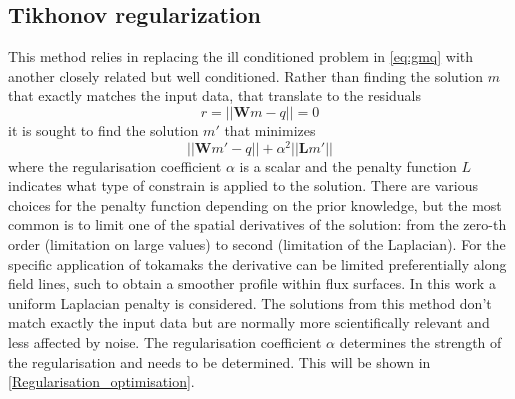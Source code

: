\subsection{Tikhonov regularization}
This method relies in replacing the ill conditioned problem in \autoref{eq:gmq} with another closely related but well conditioned. Rather than finding the solution $m$ that exactly matches the input data, that translate to the residuals
\begin{equation}
r = ||\bm{W}m-q|| = 0
\label{eq:tikhonov1}
\end{equation}
it is sought to find the solution $m'$ that minimizes
\begin{equation}
||\bm{W}m'-q|| + \alpha^2 ||\bm{L}m'||
\label{eq:tikhonov2}
\end{equation}
where the regularisation coefficient $\alpha$ is a scalar and the penalty function $L$ indicates what type of constrain is applied to the solution. There are various choices for the penalty function depending on the prior knowledge, but the most common is to limit one of the spatial derivatives of the solution: from the zero-th order (limitation on large values) to second (limitation of the Laplacian). For the specific application of tokamaks the derivative can be limited preferentially along field lines, such to obtain a smoother profile within flux surfaces.\cite{Schou2015} In this work a uniform Laplacian penalty is considered. The solutions from this method don't match exactly the input data but are normally more scientifically relevant and less affected by noise. The regularisation coefficient $\alpha$ determines the strength of the regularisation and needs to be determined. This will be shown in \autoref{Regularisation_optimisation}.
